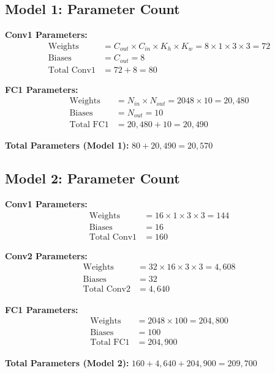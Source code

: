 \documentclass[11pt,a4paper]{article}
\begin{document}
\subsection{Model 1: Parameter Count}

\textbf{Conv1 Parameters:}
\begin{align*}
\text{Weights} &= C_{out} \times C_{in} \times K_h \times K_w = 8 \times 1 \times 3 \times 3 = 72 \\
\text{Biases} &= C_{out} = 8 \\
\text{Total Conv1} &= 72 + 8 = 80
\end{align*}

\textbf{FC1 Parameters:}
\begin{align*}
\text{Weights} &= N_{in} \times N_{out} = 2048 \times 10 = 20,480 \\
\text{Biases} &= N_{out} = 10 \\
\text{Total FC1} &= 20,480 + 10 = 20,490
\end{align*}

\textbf{Total Parameters (Model 1):} $80 + 20,490 = \boxed{20,570}$

\subsection{Model 2: Parameter Count}

\textbf{Conv1 Parameters:}
\begin{align*}
\text{Weights} &= 16 \times 1 \times 3 \times 3 = 144 \\
\text{Biases} &= 16 \\
\text{Total Conv1} &= 160
\end{align*}

\textbf{Conv2 Parameters:}
\begin{align*}
\text{Weights} &= 32 \times 16 \times 3 \times 3 = 4,608 \\
\text{Biases} &= 32 \\
\text{Total Conv2} &= 4,640
\end{align*}

\textbf{FC1 Parameters:}
\begin{align*}
\text{Weights} &= 2048 \times 100 = 204,800 \\
\text{Biases} &= 100 \\
\text{Total FC1} &= 204,900
\end{align*}

\textbf{Total Parameters (Model 2):} $160 + 4,640 + 204,900 = \boxed{209,700}$
\end{document}

